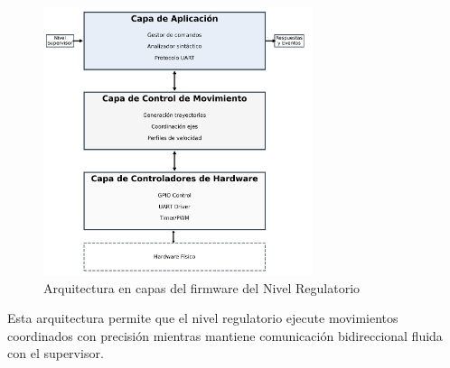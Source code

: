 \begin{figure}[H]
    \centering
    \includegraphics[width=0.7\textwidth]{imagenes/arquitectura_regulatorio_capas.png}
    \caption{Arquitectura en capas del firmware del Nivel Regulatorio}
    \label{fig:arquitectura_regulatorio}
\end{figure}

Esta arquitectura permite que el nivel regulatorio ejecute movimientos coordinados con precisión mientras mantiene comunicación bidireccional fluida con el supervisor.
